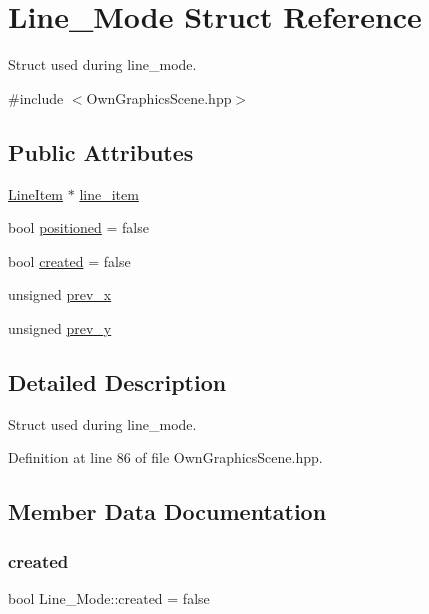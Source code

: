 \hypertarget{structLine__Mode}{}\section{Line\+\_\+\+Mode Struct Reference}
\label{structLine__Mode}


Struct used during line\+\_\+mode.  




{\ttfamily \#include $<$Own\+Graphics\+Scene.\+hpp$>$}

\subsection*{Public Attributes}
\begin{DoxyCompactItemize}
\item 
\mbox{\hyperlink{classLineItem}{Line\+Item}} $\ast$ \mbox{\hyperlink{structLine__Mode_a4e11b31f28505579f3dfcde54b27ecac}{line\+\_\+item}}
\item 
bool \mbox{\hyperlink{structLine__Mode_aefbb8555f406d47d742491003a6afde1}{positioned}} = false
\item 
bool \mbox{\hyperlink{structLine__Mode_ae48257668288a2a284bef66727fa68e5}{created}} = false
\item 
unsigned \mbox{\hyperlink{structLine__Mode_a8bbcbaff29a7810e066e99174e562371}{prev\+\_\+x}}
\item 
unsigned \mbox{\hyperlink{structLine__Mode_a8d5fb940f686955ead3f368a8d3b9016}{prev\+\_\+y}}
\end{DoxyCompactItemize}


\subsection{Detailed Description}
Struct used during line\+\_\+mode. 

Definition at line 86 of file Own\+Graphics\+Scene.\+hpp.



\subsection{Member Data Documentation}
\mbox{\label{structLine__Mode_ae48257668288a2a284bef66727fa68e5}} 
\subsubsection{\texorpdfstring{created}{created}}
{\footnotesize\ttfamily bool Line\+\_\+\+Mode\+::created = false}

